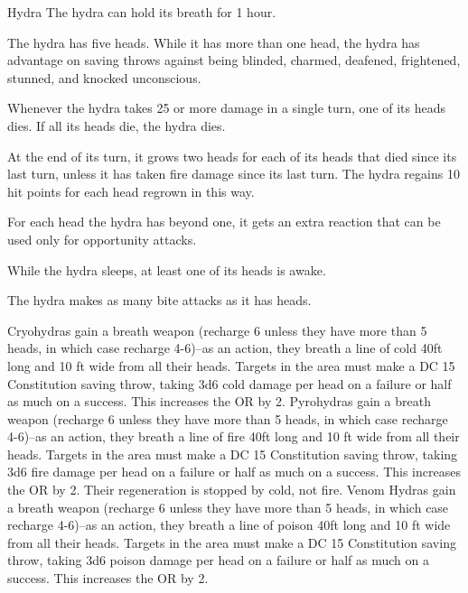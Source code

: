\begin{DndMonster}{Hydra}
	\DndMonsterBasics[armor-class={15 (natural armor)}, hit-points={172 (15d12 + 75)}, speed={30 ft., swim 30 ft.}]
	\DndMonsterDetails[saving-throws={}, skills={Perception +6}, damage-immunities={}, damage-resistances={}, damage-vulnerabilities={}, condition-immunities={}, senses={darkvision 60 ft., passive Perception 16}, languages={—}, challenge={8:10}]
	 The hydra can hold its breath for 1 hour.
	
	 The hydra has five heads. While it has more than one head, the hydra has advantage on saving throws against being blinded, charmed, deafened, frightened, stunned, and knocked unconscious.
	
	Whenever the hydra takes 25 or more damage in a single turn, one of its heads dies. If all its heads die, the hydra dies.
	
	At the end of its turn, it grows two heads for each of its heads that died since its last turn, unless it has taken fire damage since its last turn. The hydra regains 10 hit points for each head regrown in this way.
	
	 For each head the hydra has beyond one, it gets an extra reaction that can be used only for opportunity attacks.
	
	 While the hydra sleeps, at least one of its heads is awake.
	
	 The hydra makes as many bite attacks as it has heads.
	\DndMonsterAttack[
		name=Bite,
		distance=melee,
		type=weapon,
		mod=+8,
		reach=10,
		dmg=\DndDice{1d10 + 5},
		dmg-type=piercing
	]

	 Cryohydras gain a breath weapon (recharge 6 unless they have more than 5 heads, in which case recharge 4-6)--as an action, they breath a line of cold 40ft long and 10 ft wide from all their heads. Targets in the area must make a DC 15 Constitution saving throw, taking 3d6 cold damage per head on a failure or half as much on a success. This increases the OR by 2.
	 Pyrohydras gain a breath weapon (recharge 6 unless they have more than 5 heads, in which case recharge 4-6)--as an action, they breath a line of fire 40ft long and 10 ft wide from all their heads. Targets in the area must make a DC 15 Constitution saving throw, taking 3d6 fire damage per head on a failure or half as much on a success. This increases the OR by 2. Their regeneration is stopped by cold, not fire.
	 Venom Hydras gain a breath weapon (recharge 6 unless they have more than 5 heads, in which case recharge 4-6)--as an action, they breath a line of poison 40ft long and 10 ft wide from all their heads. Targets in the area must make a DC 15 Constitution saving throw, taking 3d6 poison damage per head on a failure or half as much on a success. This increases the OR by 2.
\end{DndMonster}

